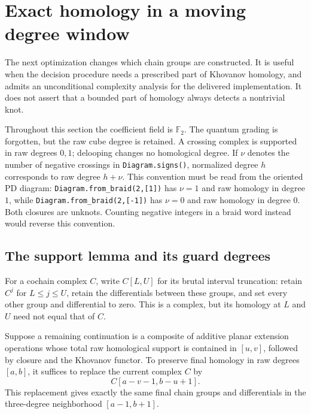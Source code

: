 \section{Exact homology in a moving degree window}
\label{sec:window-theory}

The next optimization changes which chain groups are constructed.  It is
useful when the decision procedure needs a prescribed part of Khovanov
homology, and admits an unconditional complexity analysis for the delivered
implementation.  It does not assert that a bounded part of homology always
detects a nontrivial knot.

Throughout this section the coefficient field is $\mathbb F_2$.  The quantum
grading is forgotten, but the raw cube degree is retained.  A crossing
complex is supported in raw degrees $0,1$; delooping changes no homological
degree.  If $\nu$ denotes the number of negative crossings in
\texttt{Diagram.signs()}, normalized degree $h$ corresponds to raw degree
$h+\nu$.  This convention must be read from the oriented PD diagram:
\texttt{Diagram.from\_braid(2,[1])} has $\nu=1$ and raw homology in degree
$1$, while \texttt{Diagram.from\_braid(2,[-1])} has $\nu=0$ and raw homology
in degree $0$.  Both closures are unknots.  Counting negative integers in a
braid word instead would reverse this convention.

\subsection{The support lemma and its guard degrees}

For a cochain complex $C$, write $C[L,U]$ for its brutal interval truncation:
retain $C^j$ for $L\leq j\leq U$, retain the differentials between these
groups, and set every other group and differential to zero.  This is a
complex, but its homology at $L$ and $U$ need not equal that of $C$.

\begin{lemma}
\label{lem:bounded-continuation}
Suppose a remaining continuation is a composite of additive planar
extension operations whose total raw homological support is contained in
$[u,v]$, followed by closure and the Khovanov functor.  To preserve final
homology in raw degrees $[a,b]$, it suffices to replace the current complex
$C$ by
\[
 C[a-v-1,b-u+1].
\]
This replacement gives exactly the same final chain groups and
differentials in the three-degree neighborhood $[a-1,b+1]$.
\end{lemma}

